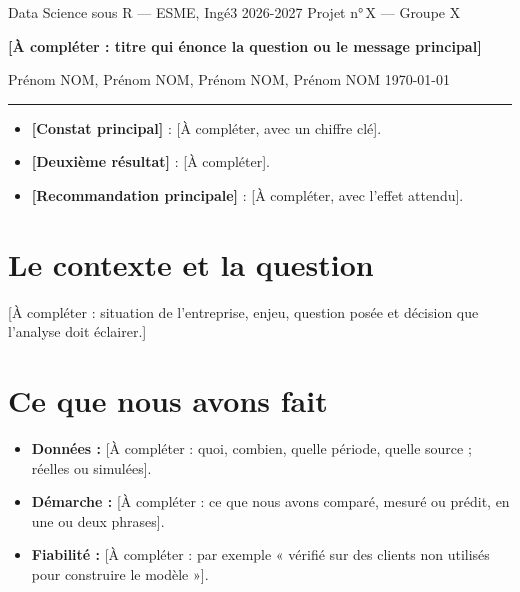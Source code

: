 \documentclass[11pt, a4paper]{article}
\newcommand{\numeroprojet}{X}
\newcommand{\titreprojet}{[À compléter : titre qui énonce la question ou le message principal]}
\newcommand{\membres}{Prénom NOM, Prénom NOM, Prénom NOM, Prénom NOM}
\newcommand{\groupe}{Groupe X}
\begin{document}
{\small\color{gray} Data Science sous R — ESME, Ingé3 2026-2027 \hfill
 Projet n°\,\numeroprojet{} — \groupe}

\vspace{0.4em}
{\LARGE\bfseries\color{principal} \titreprojet\par}
\vspace{0.3em}
{\small \membres{} \hfill \today}

\vspace{0.2em}
\rule{\linewidth}{0.4pt}

\begin{enbref}
\begin{itemize}
  \item \textbf{[Constat principal]} : [À compléter, avec un chiffre clé].
  \item \textbf{[Deuxième résultat]} : [À compléter].
  \item \textbf{[Recommandation principale]} : [À compléter, avec l'effet attendu].
\end{itemize}
\end{enbref}

\section{Le contexte et la question}
[À compléter : situation de l'entreprise, enjeu, question posée et décision
que l'analyse doit éclairer.]

\section{Ce que nous avons fait}
\begin{itemize}
  \item \textbf{Données :} [À compléter : quoi, combien, quelle période, quelle
        source ; réelles ou simulées].
  \item \textbf{Démarche :} [À compléter : ce que nous avons comparé, mesuré ou
        prédit, en une ou deux phrases].
  \item \textbf{Fiabilité :} [À compléter : par exemple « vérifié sur des clients
        non utilisés pour construire le modèle »].
\end{itemize}
\end{document}
